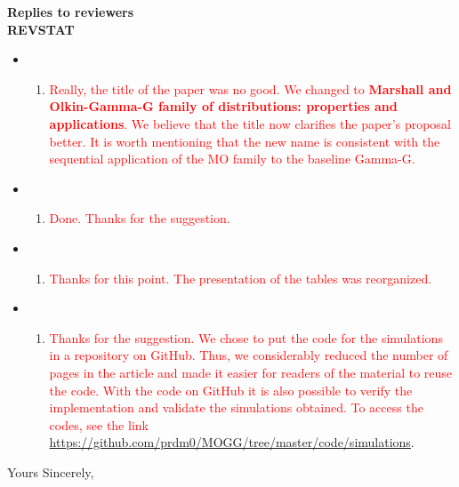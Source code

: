 \documentclass[version=last,12pt,{"maintainersDelight"},letterpaper,]{scrlttr2}
\providecommand{\tightlist}{%
  \setlength{\itemsep}{0pt}\setlength{\parskip}{0pt}}
\begin{document}
\begin{letter}{\textbf{Replies to reviewers}\\\textbf{REVSTAT}\\}
\begin{itemize}
\item
  \begin{enumerate}
  \def\labelenumi{(\roman{enumi})}
  \tightlist
  \item
    \textcolor{red}{ Really, the title of the paper was no good. We changed to \textbf{Marshall and Olkin-Gamma-G family of distributions: properties and applications}. We believe that the title now clarifies the paper's proposal better. It is worth mentioning that the new name is consistent with the sequential application of the MO family to the baseline Gamma-G.}
  \end{enumerate}
\item
  \begin{enumerate}
  \def\labelenumi{(\roman{enumi})}
  \setcounter{enumi}{1}
  \tightlist
  \item
    \textcolor{red}{Done. Thanks for the suggestion.}
  \end{enumerate}
\item
  \begin{enumerate}
  \def\labelenumi{(\roman{enumi})}
  \setcounter{enumi}{2}
  \tightlist
  \item
    \textcolor{red}{Thanks for this point. The presentation of the tables was reorganized.}
  \end{enumerate}
\item
  \begin{enumerate}
  \def\labelenumi{(\roman{enumi})}
  \setcounter{enumi}{3}
  \tightlist
  \item
    \textcolor{red}{Thanks for the suggestion. We chose to put the code for the simulations in a repository on GitHub. Thus, we considerably reduced the number of pages in the article and made it easier for readers of the material to reuse the code. With the code on GitHub it is also possible to verify the implementation and validate the simulations obtained. To access the codes, see the link 
    \url{https://github.com/prdm0/MOGG/tree/master/code/simulations}}.
  \end{enumerate}
\end{itemize}

\closing{Yours Sincerely,}




 \end{letter}
\end{document}

